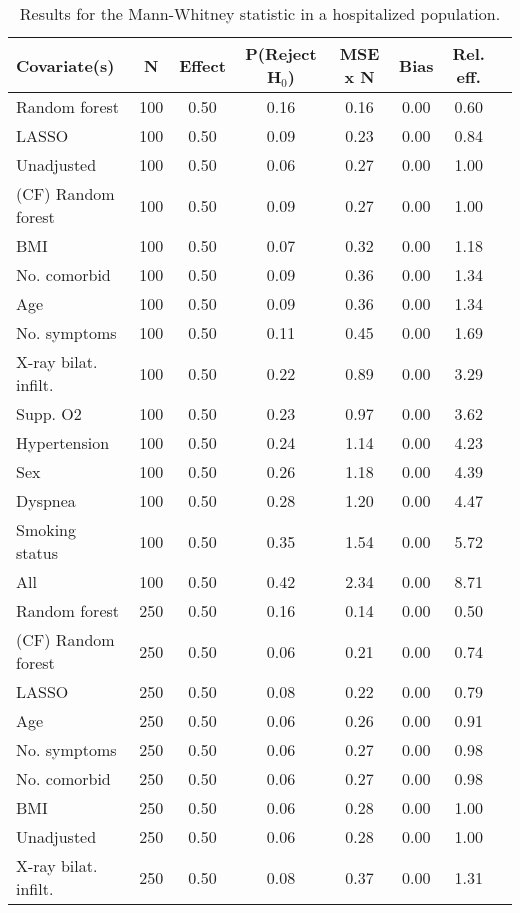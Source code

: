 \documentclass{article}
\begin{document}
{\tabcolsep=6pt  %
\begin{longtable}{lccccccc}
\caption{Results for the Mann-Whitney statistic in a hospitalized population.} \\
Covariate(s) & N & Effect & P(Reject H$_0$) & MSE x N & Bias & Rel. eff.\\ \midrule
Random forest & 100 & 0.50 & 0.16 & 0.16 & 0.00 & 0.60 \\ 
LASSO & 100 & 0.50 & 0.09 & 0.23 & 0.00 & 0.84 \\ 
Unadjusted & 100 & 0.50 & 0.06 & 0.27 & 0.00 & 1.00 \\ 
(CF) Random forest & 100 & 0.50 & 0.09 & 0.27 & 0.00 & 1.00 \\ 
BMI & 100 & 0.50 & 0.07 & 0.32 & 0.00 & 1.18 \\ 
No. comorbid & 100 & 0.50 & 0.09 & 0.36 & 0.00 & 1.34 \\ 
Age & 100 & 0.50 & 0.09 & 0.36 & 0.00 & 1.34 \\ 
No. symptoms & 100 & 0.50 & 0.11 & 0.45 & 0.00 & 1.69 \\ 
X-ray bilat. infilt. & 100 & 0.50 & 0.22 & 0.89 & 0.00 & 3.29 \\ 
Supp. O2 & 100 & 0.50 & 0.23 & 0.97 & 0.00 & 3.62 \\ 
Hypertension & 100 & 0.50 & 0.24 & 1.14 & 0.00 & 4.23 \\ 
Sex & 100 & 0.50 & 0.26 & 1.18 & 0.00 & 4.39 \\ 
Dyspnea & 100 & 0.50 & 0.28 & 1.20 & 0.00 & 4.47 \\ 
Smoking status & 100 & 0.50 & 0.35 & 1.54 & 0.00 & 5.72 \\ 
All & 100 & 0.50 & 0.42 & 2.34 & 0.00 & 8.71 \\ \midrule() 
Random forest & 250 & 0.50 & 0.16 & 0.14 & 0.00 & 0.50 \\ 
(CF) Random forest & 250 & 0.50 & 0.06 & 0.21 & 0.00 & 0.74 \\ 
LASSO & 250 & 0.50 & 0.08 & 0.22 & 0.00 & 0.79 \\ 
Age & 250 & 0.50 & 0.06 & 0.26 & 0.00 & 0.91 \\ 
No. symptoms & 250 & 0.50 & 0.06 & 0.27 & 0.00 & 0.98 \\ 
No. comorbid & 250 & 0.50 & 0.06 & 0.27 & 0.00 & 0.98 \\ 
BMI & 250 & 0.50 & 0.06 & 0.28 & 0.00 & 1.00 \\ 
Unadjusted & 250 & 0.50 & 0.06 & 0.28 & 0.00 & 1.00 \\ 
X-ray bilat. infilt. & 250 & 0.50 & 0.08 & 0.37 & 0.00 & 1.31 \\ 

\end{longtable}}
\end{document}

